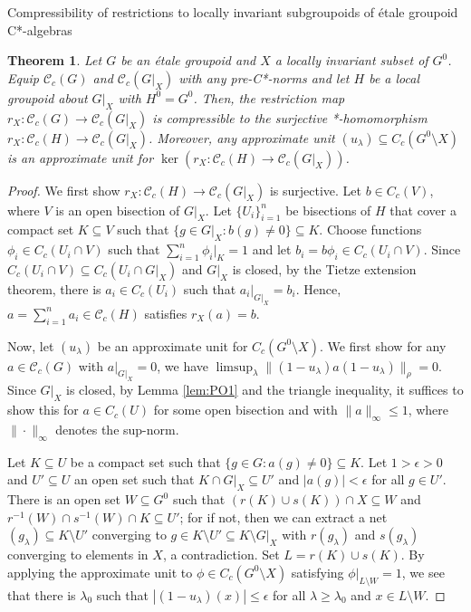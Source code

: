 \documentclass[a4paper, 12pt]{amsart}
\newtheorem{thm}{Theorem}[section]
\theoremstyle{definition}
\theoremstyle{remark}
\numberwithin{equation}{section}
\begin{document}
\begin{section}{Compressibility of restrictions to locally invariant subgroupoids of \'etale groupoid C*-algebras}
\begin{thm}
\label{thm:locinvar&compressdense}
    Let $G$ be an \'etale groupoid and $X$ a locally invariant subset of $G^{0}$. Equip $\mathscr{C}_{c}(G)$ and $\mathscr{C}_{c}(G|_{X})$ with any pre-C*-norms and let $H$ be a local groupoid about $G|_{X}$ with $H^{0} = G^{0}$. Then, the restriction map $r_{X}:\mathscr{C}_{c}(G)\to \mathscr{C}_{c}(G|_{X})$ is compressible to the surjective *-homomorphism $r_{X}:\mathscr{C}_{c}(H)\to \mathscr{C}_{c}(G|_{X})$. Moreover, any approximate unit $(u_{\lambda})\subseteq C_{c}(G^{0}\setminus X)$ is an approximate unit for $\ker(r_{X}:\mathscr{C}_{c}(H)\to \mathscr{C}_{c}(G|_{X}))$.
\end{thm}

\begin{proof}
    We first show $r_{X}:\mathscr{C}_{c}(H)\to \mathscr{C}_{c}(G|_{X})$ is surjective. Let $b\in C_{c}(V)$, where $V$ is an open bisection of $G|_{X}$. Let $\{U_{i}\}^{n}_{i=1}$ be bisections of $H$ that cover a compact set $K\subseteq V$ such that $\{g\in G|_{X}: b(g)\neq 0\}\subseteq K$. Choose functions $\phi_{i}\in C_{c}(U_{i}\cap V)$ such that $\sum^{n}_{i=1}\phi_{i}|_{K} = 1$ and let $b_{i} = b\phi_{i}\in C_{c}(U_{i}\cap V)$. Since $C_{c}(U_{i}\cap V)\subseteq C_{c}(U_{i}\cap G|_{X})$ and $G|_{X}$ is closed, by the Tietze extension theorem, there is $a_{i}\in C_{c}(U_{i})$ such that $a_{i}|_{G|_{X}} = b_{i}$. Hence, $a = \sum_{i=1}^{n}a_{i}\in \mathscr{C}_{c}(H)$ satisfies $r_{X}(a) = b$.

    Now, let $(u_{\lambda})$ be an approximate unit for $C_{c}(G^{0}\setminus X)$. We first show for any $a\in \mathscr{C}_{c}(G)$ with $a|_{G|_{X}} = 0$, we have $\limsup_{\lambda}\|(1-u_{\lambda})a(1-u_{\lambda})\|_{\rho} = 0$. Since $G|_{X}$ is closed, by Lemma \ref{lem:PO1} and the triangle inequality, it suffices to show this for $a\in C_{c}(U)$ for some open bisection and with $\|a\|_{\infty}\leq 1$, where $\|\cdot\|_{\infty}$ denotes the sup-norm. 
    
    Let $K\subseteq U$ be a compact set such that $\{g\in G: a(g)\neq 0\}\subseteq K$. Let $ 1 > \epsilon > 0$ and $U'\subseteq U$ an open set such that  $K\cap G|_{X}\subseteq U'$ and $|a(g)| < \epsilon$ for all $g\in U'$. There is an open set $W\subseteq G^{0}$ such that $(r(K)\cup s(K))\cap X\subseteq W$ and $r^{-1}(W)\cap s^{-1}(W)\cap K \subseteq U'$; for if not, then we can extract a net $(g_{\lambda})\subseteq K\setminus U'$ converging to $g\in K\setminus U'\subseteq K\setminus G|_{X}$ with $r(g_{\lambda})$ and $s(g_{\lambda})$ converging to elements in $X$, a contradiction. Set $L = r(K)\cup s(K)$. By applying the approximate unit to $\phi\in C_{c}(G^{0}\setminus X)$ satisfying $\phi|_{L\setminus W} = 1$, we see that there is $\lambda_{0}$ such that $|(1-u_{\lambda})(x)|\leq \epsilon$ for all $\lambda\geq \lambda_{0}$ and $x\in L\setminus W$.


\end{proof}
\end{section}
\end{document}
